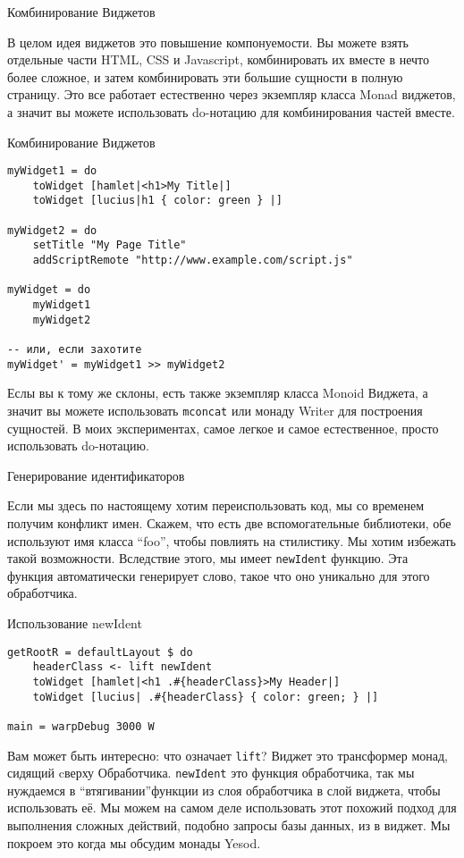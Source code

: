 Комбинирование Виджетов

В целом идея виджетов это повышение компонуемости. Вы можете взять  отдельные части HTML, CSS и Javascript, комбинировать их вместе в нечто более сложное, и затем комбинировать эти большие сущности в полную страницу. Это все работает естественно через экземпляр класса Monad виджетов, а значит вы можете использовать do-нотацию для комбинирования частей вместе.

Комбинирование Виджетов

\begin{lstlisting}
myWidget1 = do
    toWidget [hamlet|<h1>My Title|]
    toWidget [lucius|h1 { color: green } |]

myWidget2 = do
    setTitle "My Page Title"
    addScriptRemote "http://www.example.com/script.js"

myWidget = do
    myWidget1
    myWidget2

-- или, если захотите
myWidget' = myWidget1 >> myWidget2
\end{lstlisting}

Еслы вы к тому же склоны, есть также экземпляр класса Monoid Виджета, а значит вы можете использовать \lstinline'mconcat' или монаду Writer для построения сущностей. В моих экспериментах, самое легкое и самое естественное, просто использовать do-нотацию.

Генерирование идентификаторов

Если мы здесь по настоящему хотим переиспользовать код, мы со временем получим конфликт имен. Скажем, что есть две вспомогательные библиотеки, обе используют имя класса \textquotedblleft foo\textquotedblright, чтобы повлиять на стилистику. Мы хотим избежать такой возможности. Вследствие этого, мы имеет \lstinline'newIdent' функцию.  Эта функция автоматически генерирует слово, такое что оно уникально для этого обработчика.

Использование newIdent

\begin{lstlisting}
getRootR = defaultLayout $ do
    headerClass <- lift newIdent
    toWidget [hamlet|<h1 .#{headerClass}>My Header|]
    toWidget [lucius| .#{headerClass} { color: green; } |]

main = warpDebug 3000 W
\end{lstlisting}

Вам может быть интересно: что означает \lstinline'lift'? Виджет это трансформер монад, сидящий cверху Обработчика. \lstinline'newIdent' это функция обработчика, так мы нуждаемся в \textquotedblleft втягивании\textquotedblright функции из слоя обработчика в слой виджета, чтобы использовать её. Мы можем на самом деле использовать этот похожий подход для выполнения сложных действий, подобно запросы базы данных, из в виджет. Мы покроем это когда мы обсудим монады Yesod.

